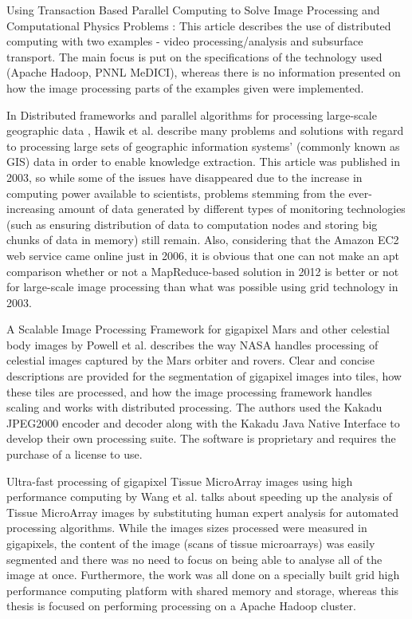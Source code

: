 \documentclass [12pt,a4paper]{report}
\begin{document}
Using Transaction Based Parallel Computing to Solve Image Processing and Computational Physics Problems \cite{trease08}: This article describes the use of distributed computing with two examples - video processing/analysis and subsurface transport. The main focus is put on the specifications of the technology used (Apache Hadoop, PNNL MeDICI), whereas there is no information presented on how the image processing parts of the examples given were implemented.

In Distributed frameworks and parallel algorithms for processing large-scale geographic data \cite{Hawick:2003:DFP:958021.958024}, Hawik et al. describe many problems and solutions with regard to processing large sets of geographic information systems' (commonly known as GIS) data in order to enable knowledge extraction. This article was published in 2003, so while some of the issues have disappeared due to the increase in computing power available to scientists, problems stemming from the ever-increasing amount of data generated by different types of monitoring technologies (such as ensuring distribution of data to computation nodes and storing big chunks of data in memory) still remain. Also, considering that the Amazon EC2 \cite{website:amazon_ec2} web service came online just in 2006, it is obvious that one can not make an apt comparison whether or not a MapReduce-based solution in 2012 is better or not for large-scale image processing than what was possible using grid technology in 2003.

A Scalable Image Processing Framework for gigapixel Mars and other celestial body  images \cite{5446706} by Powell et al. describes the way NASA handles processing of celestial images captured by the Mars orbiter and rovers. Clear and concise descriptions are provided for the segmentation of gigapixel images into tiles, how these tiles are processed, and how the image processing framework handles scaling and works with distributed processing. The authors used the Kakadu JPEG2000 encoder and decoder along with the Kakadu Java Native Interface to develop their own processing suite. The software is proprietary and requires the purchase of a license to use.

Ultra-fast processing of gigapixel Tissue MicroArray images using high performance computing \cite{wang2011ult} by Wang et al. talks about speeding up the analysis of Tissue MicroArray images by substituting human expert analysis for automated processing algorithms. While the images sizes processed were measured in gigapixels, the content of the image (scans of tissue microarrays) was easily segmented and there was no need to focus on being able to analyse all of the image at once. Furthermore, the work was all done on a specially built grid high performance computing platform with shared memory and storage, whereas this thesis is focused on performing processing on a Apache Hadoop cluster.
\end{document}
